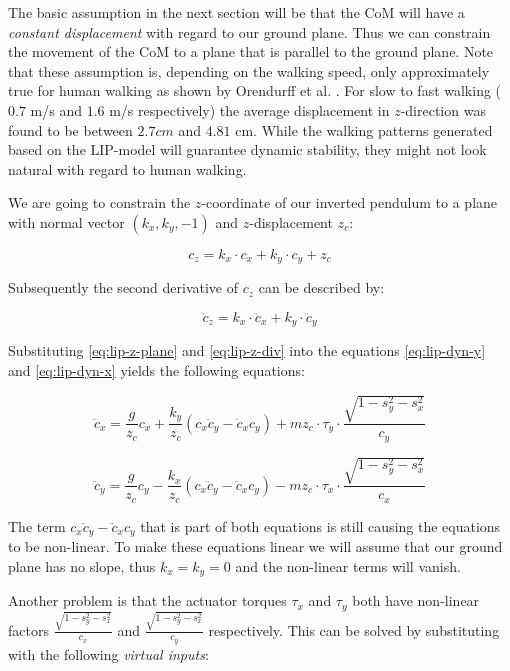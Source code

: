 \documentclass[english,ngerman]{KITreprt}
\begin{document}
The basic assumption in the next section will be that the CoM will have
a \emph{constant displacement} with regard to our ground plane. Thus we
can constrain the movement of the CoM to a plane that is parallel to the
ground plane. Note that these assumption is, depending on the walking
speed, only approximately true for human walking as shown by Orendurff
et al. \citep{orendurff2004effect}. For slow to fast walking ($0.7$ m/s
and $1.6$ m/s respectively) the average displacement in $z$-direction
was found to be between $2.7cm$ and $4.81$ cm. While the walking
patterns generated based on the LIP-model will guarantee dynamic
stability, they might not look natural with regard to human walking.

We are going to constrain the $z$-coordinate of our inverted pendulum to
a plane with normal vector $(k_x, k_y, -1)$ and $z$-displacement $z_c$:

\begin{equation} \label{eq:lip-z-plane}
c_z = k_x \cdot c_x + k_y \cdot c_y + z_c
\end{equation}

Subsequently the second derivative of $c_z$ can be described by:

\begin{equation} \label{eq:lip-z-div}
\ddot{c}_z = k_x \cdot \ddot{c}_x + k_y \cdot \ddot{c}_y
\end{equation}

Substituting \ref{eq:lip-z-plane} and \ref{eq:lip-z-div} into the
equations \ref{eq:lip-dyn-y} and \ref{eq:lip-dyn-x} yields the following
equations:

\begin{equation}
\ddot{c}_x = \frac{g}{z_c} c_x + \frac{k_y}{z_c} (c_x \ddot{c}_y - \ddot{c}_x c_y) + m z_c \cdot \tau_y \cdot \frac{\sqrt{1 - s_y^2 - s_x^2}}{c_y}
\end{equation}

\begin{equation}
\ddot{c}_y = \frac{g}{z_c} c_y - \frac{k_x}{z_c} (c_x \ddot{c}_y - \ddot{c}_x c_y) - m z_c \cdot \tau_x \cdot \frac{\sqrt{1 - s_y^2 - s_x^2}}{c_x}
\end{equation}

The term $c_x \ddot{c}_y - \ddot{c}_x c_y$ that is part of both
equations is still causing the equations to be non-linear. To make these
equations linear we will assume that our ground plane has no slope, thus
$k_x = k_y = 0$ and the non-linear terms will vanish.

Another problem is that the actuator torques $\tau_x$ and $\tau_y$ both
have non-linear factors $\frac{\sqrt{1 - s_y^2 - s_x^2}}{c_x}$ and
$\frac{\sqrt{1 - s_y^2 - s_x^2}}{c_y}$ respectively. This can be solved
by substituting with the following \emph{virtual inputs}:
\end{document}
